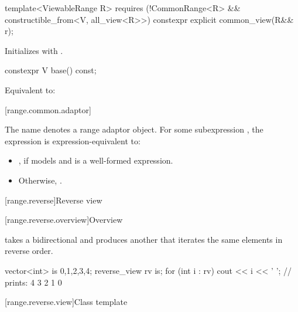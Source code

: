 %
\begin{itemdecl}
template<ViewableRange R>
  requires (!CommonRange<R> && constructible_from<V, all_view<R>>)
constexpr explicit common_view(R&& r);
\end{itemdecl}

\begin{itemdescr}
\pnum
\effects Initializes  with .
\end{itemdescr}

%
\begin{itemdecl}
constexpr V base() const;
\end{itemdecl}

\begin{itemdescr}
\pnum
\effects Equivalent to: 
\end{itemdescr}

[range.common.adaptor]{}

\pnum
The name  denotes a
range adaptor object.
For some subexpression ,
the expression  is expression-equivalent to:

\begin{itemize}
\item {},
  if  models 
  and  is a well-formed expression.

\item Otherwise, .
\end{itemize}

[range.reverse]{Reverse view}

[range.reverse.overview]{Overview}

\pnum
{} takes a bidirectional  and produces
another  that iterates the same elements in reverse order.

\pnum
\begin{example}
\begin{codeblock}
vector<int> is {0,1,2,3,4};
reverse_view rv {is};
for (int i : rv)
  cout << i << ' '; // prints: 4 3 2 1 0
\end{codeblock}
\end{example}

[range.reverse.view]{Class template }

